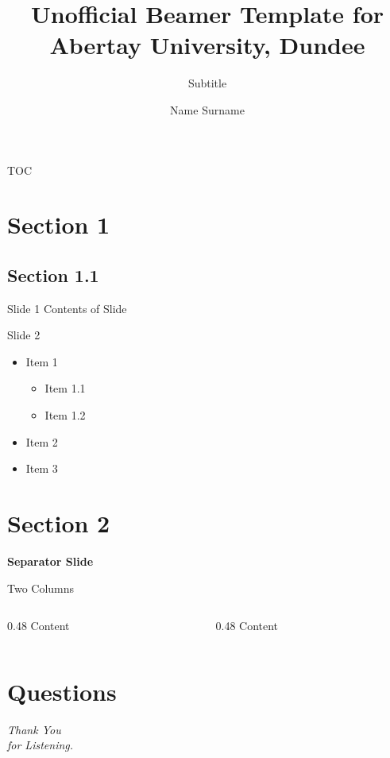 \documentclass[aspectratio=169, 169]{beamer}
\title{Unofficial Beamer Template for Abertay University, Dundee}
\subtitle{Subtitle}
\author{Name Surname}
\begin{document}
\begin{frame}
    \titlepage
\end{frame}

\begin{frame}{TOC}
	\tableofcontents
\end{frame}

\section{Section 1}
\subsection{Section 1.1}
\begin{frame}{Slide 1}
Contents of Slide 
\end{frame}

\begin{frame}{Slide 2}
\begin{itemize}
    \item Item 1 
        \begin{itemize}
            \item Item 1.1
            \item Item 1.2
        \end{itemize}
    \item Item 2
    \item Item 3 
\end{itemize}
\end{frame}


\section{Section 2}
\begin{frame}{}
    \centering
    \Huge{\textbf{Separator Slide}}
\end{frame}


\begin{frame}{Two Columns}
    \begin{columns}
        \begin{column}{0.48\linewidth}
            Content
        \end{column}
        \begin{column}{0.48\linewidth}
           Content
        \end{column}
    \end{columns}
\end{frame}



\section{Questions}
\begin{frame}
\centering \Huge
\emph{Thank You\\for Listening.}
\end{frame}
\end{document}
